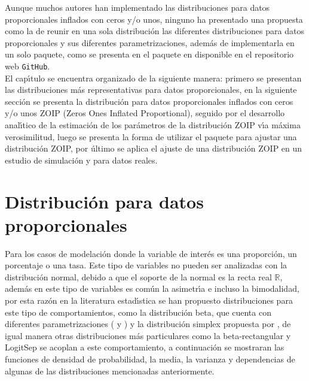 Aunque muchos autores han implementado las distribuciones para datos proporcionales inflados con ceros y/o unos, ninguno ha presentado una propuesta como la de reunir en una sola distribuci\'{o}n las diferentes distribuciones para datos proporcionales y sus diferentes parametrizaciones, adem\'{a}s de implementarla en un solo paquete, como se presenta en el paquete  en \cite{R} disponible en el repositorio web \verb|GitHub|.\\

El cap\'{\i}tulo se encuentra organizado de la siguiente manera: primero se presentan las distribuciones m\'{a}s representativas para datos proporcionales, en la siguiente secci\'{o}n se presenta la distribuci\'{o}n para datos proporcionales inflados con ceros y/o unos ZOIP (Zeros Ones Inflated Proportional), seguido por el desarrollo anal\'{\i}tico de la estimaci\'{o}n de los par\'{a}metros de la distribuci\'{o}n ZOIP v\'{\i}a m\'{a}xima verosimilitud, luego se presenta la forma de utilizar el paquete  para ajustar una distribuci\'{o}n ZOIP, por \'{u}ltimo se aplica el ajuste de una distribuci\'{o}n ZOIP en un estudio de simulaci\'{o}n y para datos reales.


\section{Distribuci\'{o}n para datos proporcionales} \label{Sec_dist_prop}

Para los casos de modelaci\'{o}n donde la variable de inter\'{e}s es una proporci\'{o}n, un porcentaje o una tasa. Este tipo de variables no pueden ser analizadas con la distribuci\'{o}n normal, debido a que el soporte de la normal es la recta real $\mathbb{R}$, adem\'{a}s en este tipo de variables es com\'{u}n la asimetr\'{\i}a e incluso la bimodalidad, por esta raz\'{o}n en la literatura estad\'{\i}stica se han propuesto distribuciones para este tipo de comportamientos, como la distribuci\'{o}n beta, que cuenta con diferentes parametrizaciones (\cite{Ferrari2} y \cite{Stasinopoulos2}) y la distribuci\'{o}n simplex propuesta por \cite{Barndorff1}, de igual manera otras distribuciones m\'{a}s particulares como la beta-rectangular \citep{Hahn1} y LogitSep \citep{Hossain1} se acoplan a este comportamiento, a continuaci\'{o}n se mostraran las funciones de densidad de probabilidad, la media, la varianza y dependencias de algunas de las distribuciones mencionadas anteriormente.

